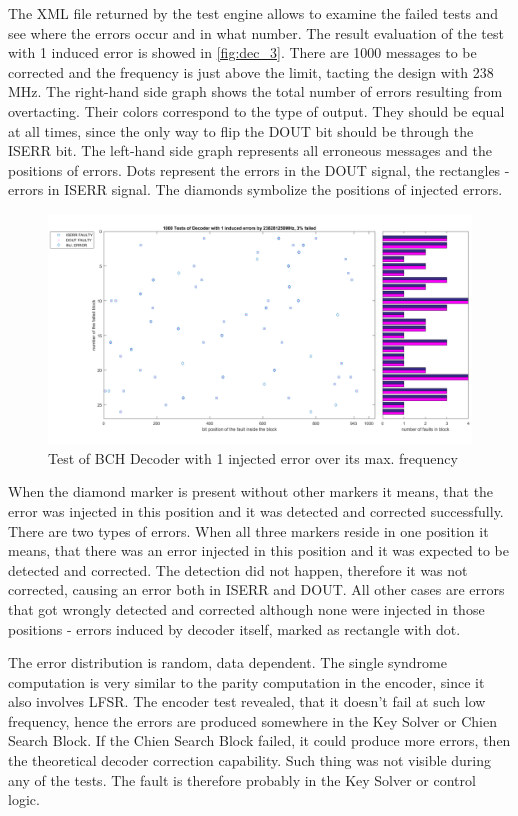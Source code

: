 The XML file returned by the test engine allows to examine the failed tests and see where the errors occur and in what number. The result evaluation of the test with 1 induced error is showed in \autoref{fig:dec_3}. There are 1000 messages to be corrected and the frequency is just above the limit, tacting the design with 238 MHz. The right-hand side graph shows the total number of errors resulting from overtacting. Their colors correspond to the type of output. They should be equal at all times, since the only way to flip the DOUT bit should be through the ISERR bit. The left-hand side graph represents all erroneous messages and the positions of errors. Dots represent the errors in the DOUT signal, the rectangles - errors in ISERR signal. The diamonds symbolize the positions of injected errors.

\begin{figure}[h]
\centering
\includegraphics[width=\textwidth]{figures/1000_tests_1_faults_238_MHz.png}
\caption{Test of BCH Decoder with 1 injected error over its max. frequency}
\label{fig:dec_3}
\end{figure}

When the diamond marker is present without other markers it means, that the error was injected in this position and it was detected and corrected successfully. There are two types of errors. When all three markers reside in one position it means, that there was an error injected in this position and it was expected to be detected and corrected. The detection did not happen, therefore it was not corrected, causing an error both in ISERR and DOUT. All other cases are errors that got wrongly detected and corrected although none were injected in those positions - errors induced by decoder itself, marked as rectangle with dot. 

The error distribution is random, data dependent. The single syndrome computation is very similar to the parity computation in the encoder, since it also involves LFSR. The encoder test revealed, that it doesn't fail at such low frequency, hence the errors are produced somewhere in the Key Solver or Chien Search Block. If the Chien Search Block failed, it could produce more errors, then the theoretical decoder correction capability. Such thing was not visible during any of the tests. The fault is therefore probably in the Key Solver or control logic.

